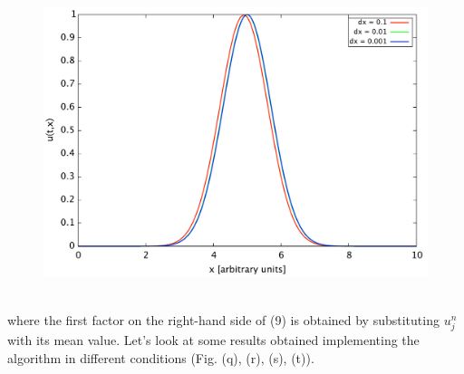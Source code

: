\documentclass[11pt,a4paper]{article}
\begin{document}
\begin{figure}[!h]
{\includegraphics[scale=0.25]{good_img/lxfr_cf1_t10_g}}
\end{figure}\\
where the first factor on the right-hand side of (9) is obtained by substituting $u_j^n$ with its mean value. Let's look at some results obtained implementing the algorithm in different conditions (Fig. (q), (r), (s), (t)). 
\end{document}
